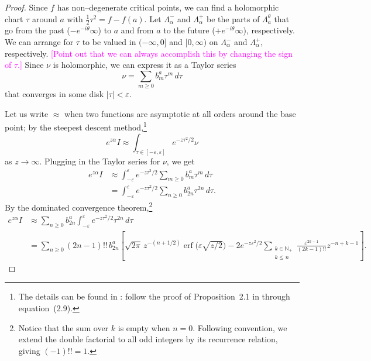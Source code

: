\documentclass{article}
\theoremstyle{definition}
\theoremstyle{plain}
\begin{document}
\begin{proof}
Since $f$ has non--degenerate critical points, we can find a holomorphic chart $\tau$ around $a$ with $\tfrac{1}{2} \tau^2 = f - f(a)$. Let $\Lambda^-_\alpha$ and $\Lambda^+_\alpha$ be the parts of $\Lambda_a^\theta$ that go from the past ($-e^{-i\theta}\infty$) to $a$ and from $a$ to the future ($+e^{-i\theta}\infty$), respectively. We can arrange for $\tau$ to be valued in $(-\infty, 0]$ and $[0,\infty)$ on $\Lambda^-_\alpha$ and $\Lambda^+_\alpha$, respectively. \textcolor{magenta}{[Point out that we can always accomplish this by changing the sign of $\tau$.]} Since $\nu$ is holomorphic, we can express it as a Taylor series
\[ \nu = \sum_{m \ge 0} b_m^a \tau^m\,d\tau \]
that converges in some disk $|\tau| < \varepsilon$.

Let us write $\approx$ when two functions are asymptotic at all orders around the base point; by the steepest descent method,\footnote{The details can be found in \cite{miller2006applied}: follow the proof of Proposition~2.1 in through equation~(2.9).}
\[ e^{z \alpha} I \approx \int_{\tau \in [-\varepsilon, \varepsilon]} e^{-z\tau^2/2} \nu \]
as $z \to \infty$. Plugging in the Taylor series for $\nu$, we get
\begin{align*}
e^{z \alpha} I & \approx \int_{-\varepsilon}^\varepsilon e^{-z\tau^2/2} \sum_{m \ge 0} b_m^a \tau^m\,d\tau \\
& = \int_{-\varepsilon}^\varepsilon e^{-z\tau^2/2} \sum_{n \ge 0} b_{2n}^a \tau^{2n}\,d\tau.
\end{align*}
By the dominated convergence theorem,\footnote{Notice that the sum over $k$ is empty when $n = 0$. Following convention, we extend the double factorial to all odd integers by its recurrence relation, giving $(-1)!! = 1$.}
\begin{align*}
e^{z \alpha} I & \approx \sum_{n \ge 0} b_{2n}^a \int_{-\varepsilon}^\varepsilon e^{-z\tau^2/2} \tau^{2n}\,d\tau \\
& = \sum_{n \ge 0} (2n-1)!!\,b_{2n}^a \left[ \sqrt{2\pi}\,z^{-(n+1/2)} \operatorname{erf}\big(\varepsilon \sqrt{z/2}\big) - 2e^{-z\varepsilon^2/2} \sum_{\substack{k \in \mathbb{N}_+ \\ k \le n}} \frac{\varepsilon^{2k-1}}{(2k-1)!!} z^{-n+k-1} \right].
\end{align*}


\end{proof}
\end{document}
